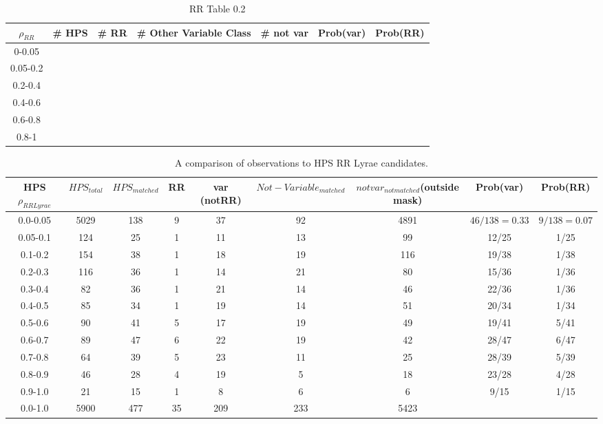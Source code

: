 \documentclass[aps,prb,twocolumn,superscriptaddress]{revtex4-1}
\begin{document}
	\begin{table}[H]
	\begin{center}
		\begin{tabular}{ | c | c | c | c | c | c | c | }\hline
		$\rho_{RR}$ & \# HPS & \# RR & \# Other Variable Class & \# not var & Prob(var) & Prob(RR) \\ \hline
		0-0.05 &&&&&& \\ \hline
		0.05-0.2 &&&&&& \\ \hline
		0.2-0.4 &&&&&& \\ \hline
		0.4-0.6 &&&&&& \\ \hline
		0.6-0.8 &&&&&& \\ \hline
		0.8-1 &&&&&& \\ \hline
		\end{tabular}
	\end{center}
	\caption{ \small{RR Table 0.2 \label{tab:rrtab}}}
	\end{table}
\fi


\begin{table}
	\begin{center}
		\begin{tabular}{|c|c|c|c|c|c|c|c|c|}\hline
HPS $\rho_{RRLyrae}$ & $HPS_{total}$ & $HPS_{matched}$ & RR & var (notRR) & $Not-Variable_{matched}$ &$notvar_{notmatched}$(outside mask)& Prob(var)&Prob(RR) \\ \hline
0.0-0.05 & 5029 & 138 & 9 & 37 & 92 & 4891 & $46/138=0.33$ & $9/138=0.07$	\\ \hline
0.05-0.1 & 124 & 25 & 1 & 11 & 13 & 99 & 12/25 & 1/25 \\ \hline
0.1-0.2 & 154 & 38 & 1 & 18 & 19 & 116 & 19/38 & 1/38 \\ \hline
0.2-0.3 & 116 & 36 & 1 & 14 & 21 & 80 & 15/36 & 1/36 \\ \hline
0.3-0.4 & 82 & 36 & 1 & 21 & 14 & 46 & 22/36 & 1/36	\\ \hline
0.4-0.5 & 85 & 34 & 1 & 19 & 14 & 51 & 20/34 & 1/34	\\ \hline
0.5-0.6 & 90 & 41 & 5 & 17 & 19 & 49 & 19/41 & 5/41	\\ \hline
0.6-0.7 & 89 & 47 & 6 & 22 & 19 & 42 & 28/47 & 6/47	\\ \hline
0.7-0.8 & 64 & 39 & 5 & 23 & 11 & 25 & 28/39 & 5/39	\\ \hline
0.8-0.9 & 46 & 28 & 4 & 19 & 5 & 18 & 23/28 & 4/28	\\ \hline
0.9-1.0 & 21 & 15 & 1 & 8 & 6 & 6 & 9/15 & 1/15	\\ \hline
\hline
0.0-1.0 & 5900 & 477 & 35 & 209 & 233 & 5423 & & \\ \hline
		\end{tabular}
	\end{center}
\caption{ \small{A comparison of observations to HPS RR Lyrae candidates. \label{tab:HPSlim15}}}
\end{table}
\end{document}
